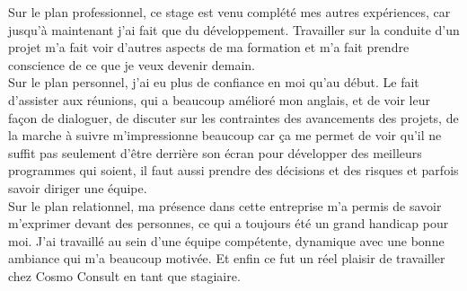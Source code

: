 \documentclass[11pt]{report}
\begin{document}
\hspace{1cm} Sur le plan professionnel, ce stage est venu complété mes autres expériences, car jusqu’à maintenant j’ai fait que du développement. Travailler sur la conduite d’un projet m’a fait voir d’autres aspects de ma formation et m’a fait prendre conscience de ce que je veux devenir demain.\\ 

\hspace{1cm} Sur le plan personnel, j’ai eu plus de confiance en moi qu’au début. Le fait d’assister aux réunions, qui a beaucoup amélioré mon anglais, et de voir leur façon de dialoguer, de discuter sur les contraintes des avancements des projets, de la marche à suivre m’impressionne beaucoup car ça me permet de voir qu’il ne suffit pas seulement d’être derrière son écran pour développer des meilleurs programmes qui soient, il faut aussi prendre des décisions et des risques et parfois savoir diriger une équipe.\\

\hspace{1cm} Sur le plan relationnel, ma présence dans cette entreprise m’a permis de savoir m’exprimer devant des personnes, ce qui a toujours été un grand handicap pour moi. J’ai travaillé au sein d’une équipe compétente, dynamique avec une bonne ambiance qui m’a beaucoup motivée. Et enfin ce fut un réel plaisir de travailler chez Cosmo Consult en tant que stagiaire.

\newpage
\end{document}
